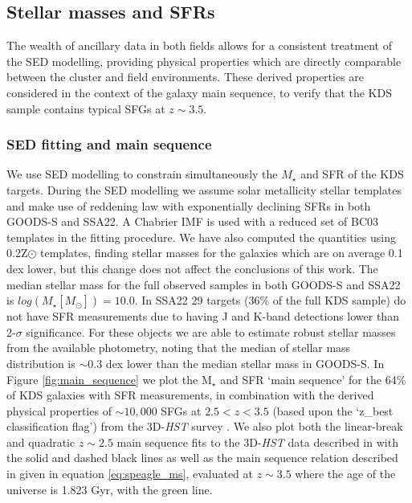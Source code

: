 \documentclass[fleqn,usenatbib]{mn2e}
\begin{document}
\subsection{Stellar masses and SFRs}\label{subsec:stellar_masses_and_sfrs}
The wealth of ancillary data in both fields allows for a consistent treatment of the SED modelling, providing physical properties which are directly comparable between the cluster and field environments.
These derived properties are considered in the context of the galaxy main sequence, to verify that the KDS sample contains typical SFGs at $z\sim3.5$.   

\subsubsection{SED fitting and main sequence}\label{subsubsec:sed_fitting}
We use SED modelling to constrain simultaneously the $M_{\star}$ and SFR of the KDS targets.
During the SED modelling we assume solar metallicity stellar templates and make use of \cite{Calzetti2000} reddening law with exponentially declining SFRs in both GOODS-S and SSA22.
A Chabrier IMF is used with a reduced set of BC03 \citep{Bruzual2003} templates in the fitting procedure.
We have also computed the quantities using 0.2Z$\odot$ templates, finding stellar masses for the galaxies which are on average 0.1 dex lower, but this change does not affect the conclusions of this work.
The median stellar mass for the full observed samples in both GOODS-S and SSA22 is $log(M_{\star}[M_{\odot}]) = 10.0$.
In SSA22 29 targets (36\% of the full KDS sample) do not have SFR measurements due to having J and K-band detections lower than 2-$\sigma$ significance.
For these objects we are able to estimate robust stellar masses from the available photometry, noting that the median of stellar mass distribution is $\sim 0.3$ dex lower than the median stellar mass in GOODS-S.
In Figure \ref{fig:main_sequence} we plot the M$_{\star}$ and SFR `main sequence' for the 64\% of KDS galaxies with SFR measurements, in combination with the derived physical properties of $\sim 10,000$ SFGs at $2.5 < z < 3.5$  (based upon the `z\_best classification flag') from the 3D-{\em HST} survey \citep{Brammer2012,Momcheva2016}.
We also plot both the linear-break and quadratic $z\sim 2.5$ main sequence fits to the 3D-{\em HST} data described in \cite{Whitaker2014} with the solid and dashed black lines as well as the main sequence relation described in \cite{Speagle2014} given in equation \ref{eq:speagle_ms}, evaluated at $z\sim3.5$ where the age of the universe is 1.823 Gyr, with the green line.
\end{document}
